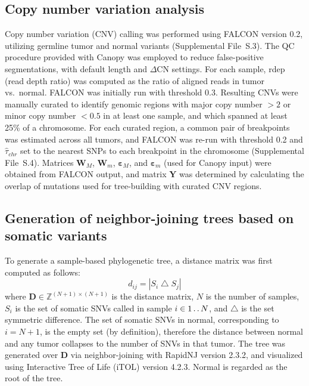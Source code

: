 \subsection{Copy number variation analysis}
\label{ssec:240:cnv_methods}
Copy number variation (CNV) calling was performed using FALCON \cite{falcon} version 0.2, utilizing germline tumor and normal variants (Supplemental File~S\thechapter{}.3). The QC procedure provided with Canopy \cite{canopy} was employed to reduce false-positive segmentations, with default length and $\Delta$CN settings. For each sample, rdep (read depth ratio) was computed as the ratio of aligned reads in tumor vs.\ normal. FALCON was initially run with threshold 0.3. Resulting CNVs were manually curated to identify genomic regions with major copy number $>2$ or minor copy number $<0.5$ in at least one sample, and which spanned at least \textapprox{}25\% of a chromosome. For each curated region, a common pair of breakpoints was estimated across all tumors, and FALCON was re-run with threshold 0.2 and $\hat\tau_{chr}$ set to the nearest SNPs to each breakpoint in the chromosome (Supplemental File~S\thechapter{}.4). Matrices $\mathbf{W}_M$, $\mathbf{W}_m$, $\mathbf{\varepsilon}_M$, and $\mathbf{\varepsilon}_m$ (used for Canopy input) were obtained from FALCON output, and matrix $\mathbf{Y}$ was determined by calculating the overlap of mutations used for tree-building with curated CNV regions.

\subsection[Neighbor-joining trees]{Generation of neighbor-joining trees based on somatic variants}
\label{ssec:240:nj_methods}
To generate a sample-based phylogenetic tree, a distance matrix was first computed as follows:
\begin{equation}
    d_{ij} = \left| S_i \bigtriangleup S_j \right|
\end{equation}
where $\mathbf{D} \in \mathbb{Z}^{(N + 1) \times (N + 1)}$ is the distance matrix, $N$ is the number of samples, $S_i$ is the set of somatic SNVs called in sample $i \in 1 \mathinner {\ldotp \ldotp} N$, and $\bigtriangleup$ is the set symmetric difference. The set of somatic SNVs in normal, corresponding to $i = N + 1$, is the empty set (by definition), therefore the distance between normal and any tumor collapses to the number of SNVs in that tumor. The tree was generated over $\mathbf{D}$ via neighbor-joining \cite{saitou1987} with RapidNJ \cite{simonsen08} version 2.3.2, and visualized using Interactive Tree of Life (iTOL) \cite{letunic16} version 4.2.3. Normal is regarded as the root of the tree.

